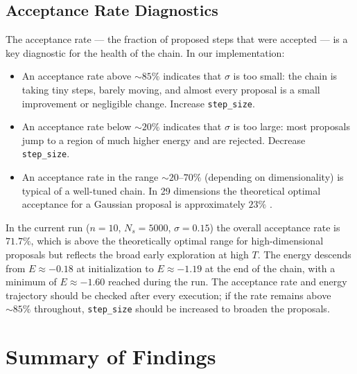 \documentclass[11pt, letterpaper]{article}
\begin{document}
\subsection{Acceptance Rate Diagnostics}

The acceptance rate --- the fraction of proposed steps that were accepted ---
is a key diagnostic for the health of the chain.  In our implementation:
\begin{itemize}[noitemsep]
  \item An acceptance rate above $\sim 85\%$ indicates that $\sigma$ is too
        small: the chain is taking tiny steps, barely moving, and almost
        every proposal is a small improvement or negligible change.  Increase
        \texttt{step\_size}.
  \item An acceptance rate below $\sim 20\%$ indicates that $\sigma$ is too
        large: most proposals jump to a region of much higher energy and are
        rejected.  Decrease \texttt{step\_size}.
  \item An acceptance rate in the range $\sim 20$--$70\%$ (depending on
        dimensionality) is typical of a well-tuned chain.  In 29 dimensions
        the theoretical optimal acceptance for a Gaussian proposal is
        approximately $23\%$ \cite{roberts1997}.
\end{itemize}

In the current run ($n=10$, $N_s = 5000$, $\sigma = 0.15$) the overall
acceptance rate is $71.7\%$, which is above the theoretically optimal
range for high-dimensional proposals but reflects the broad early
exploration at high $T$.  The energy descends from $E \approx -0.18$
at initialization to $E \approx -1.19$ at the end of the chain, with
a minimum of $E \approx -1.60$ reached during the run.  The acceptance
rate and energy trajectory should be checked after every execution; if
the rate remains above $\sim 85\%$ throughout, \texttt{step\_size}
should be increased to broaden the proposals.

\section{Summary of Findings}
\end{document}
